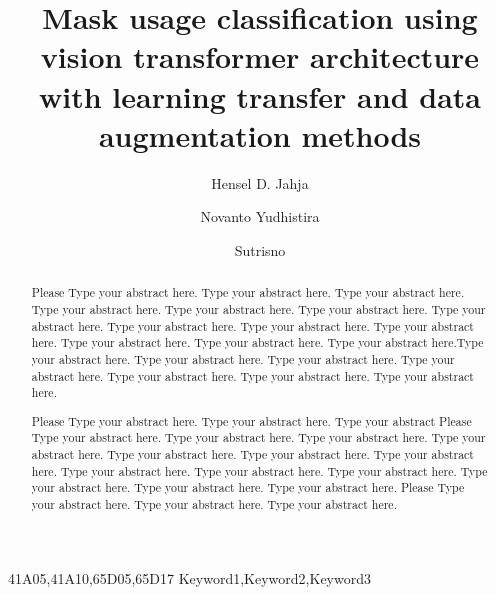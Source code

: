 \documentclass[times,onecolumn,final,longtitle]{elsarticle}
\begin{document}

\begin{frontmatter}

  \title{Mask usage classification using vision transformer
    architecture with learning transfer and data augmentation methods}%

  \author{Hensel D. Jahja}
  \author{Novanto Yudhistira}
  \author{Sutrisno}

  \address{Faculty of Computer Science, Jalan Veteran, Malang 65145, Indonesia}


  \begin{abstract}
    Please Type your abstract here. Type your abstract here. Type your abstract
    here. Type your abstract here. Type your abstract here. Type your
    abstract here. Type your abstract here. Type your abstract here. Type
    your abstract here. Type your abstract here. Type your abstract here.
    Type your abstract here. Type your abstract here.Type your abstract here.
    Type your abstract here. Type your abstract here. Type your abstract here.
    Type your abstract here. Type your abstract here. Type your abstract here.

    Please Type your abstract here. Type your abstract here. Type your abstract
    Please Type your abstract here. Type your abstract here. Type your abstract
    here. Type your abstract here. Type your abstract here. Type your
    abstract here. Type your abstract here. Type your abstract here. Type
    your abstract here. Type your abstract here. Type your abstract here.
    Type your abstract here. Type your abstract here.
    Please Type your abstract here. Type your abstract here.
    Type your abstract here.
  \end{abstract}

  \begin{keyword}
    \MSC 41A05\sep 41A10\sep 65D05\sep 65D17
    \KWD Keyword1\sep Keyword2\sep Keyword3
  \end{keyword}

\end{frontmatter}
\end{document}
